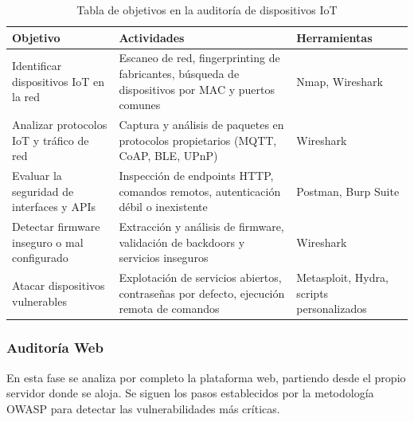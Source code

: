\documentclass[a4paper, 11pt]{article}
\begin{document}
\begin{table}[H]
\centering
\renewcommand{\arraystretch}{1.4}
\begin{tabular}{|p{4.3cm}|p{6.5cm}|p{4.3cm}|}
\hline
\textbf{Objetivo} & \textbf{Actividades} & \textbf{Herramientas} \\
\hline
Identificar dispositivos IoT en la red & Escaneo de red, fingerprinting de fabricantes, búsqueda de dispositivos por MAC y puertos comunes & Nmap, Wireshark \\
\hline
Analizar protocolos IoT y tráfico de red & Captura y análisis de paquetes en protocolos propietarios (MQTT, CoAP, BLE, UPnP) & Wireshark \\
\hline
Evaluar la seguridad de interfaces y APIs & Inspección de endpoints HTTP, comandos remotos, autenticación débil o inexistente & Postman, Burp Suite \\
\hline
Detectar firmware inseguro o mal configurado & Extracción y análisis de firmware, validación de backdoors y servicios inseguros & Wireshark \\
\hline
Atacar dispositivos vulnerables & Explotación de servicios abiertos, contraseñas por defecto, ejecución remota de comandos & Metasploit, Hydra, scripts personalizados \\
\hline
\end{tabular}
\caption{Tabla de objetivos en la auditoría de dispositivos IoT}
\end{table}


\subsubsection{Auditoría Web}

En esta fase se analiza por completo la plataforma web, partiendo desde el propio servidor donde se aloja. Se siguen los pasos establecidos por la metodología OWASP para detectar las vulnerabilidades más críticas.
\end{document}

